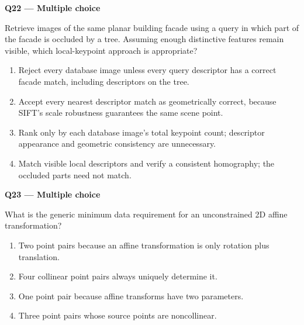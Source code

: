 \documentclass[11pt,a4paper]{article}
\begin{document}
\par\vspace{12pt}
\begin{minipage}{\linewidth}
\textbf{Q22 — Multiple choice}\par\smallskip
Retrieve images of the same planar building facade using a query in which part of the facade is occluded by a tree. Assuming enough distinctive features remain visible,\allowbreak{} which local-keypoint approach is appropriate?
\begin{enumerate}[label=\textbf{\Alph*.}]
\item Reject every database image unless every query descriptor has a correct facade match,\allowbreak{} including descriptors on the tree.
\item Accept every nearest descriptor match as geometrically correct,\allowbreak{} because SIFT's scale robustness guarantees the same scene point.
\item Rank only by each database image's total keypoint count; descriptor appearance and geometric consistency are unnecessary.
\item Match visible local descriptors and verify a consistent homography; the occluded parts need not match.
\end{enumerate}
\end{minipage}
\par\vspace{12pt}
\begin{minipage}{\linewidth}
\textbf{Q23 — Multiple choice}\par\smallskip
What is the generic minimum data requirement for an unconstrained 2D affine transformation?
\begin{enumerate}[label=\textbf{\Alph*.}]
\item Two point pairs because an affine transformation is only rotation plus translation.
\item Four collinear point pairs always uniquely determine it.
\item One point pair because affine transforms have two parameters.
\item Three point pairs whose source points are noncollinear.
\end{enumerate}
\end{minipage}
\par\vspace{12pt}
\end{document}
